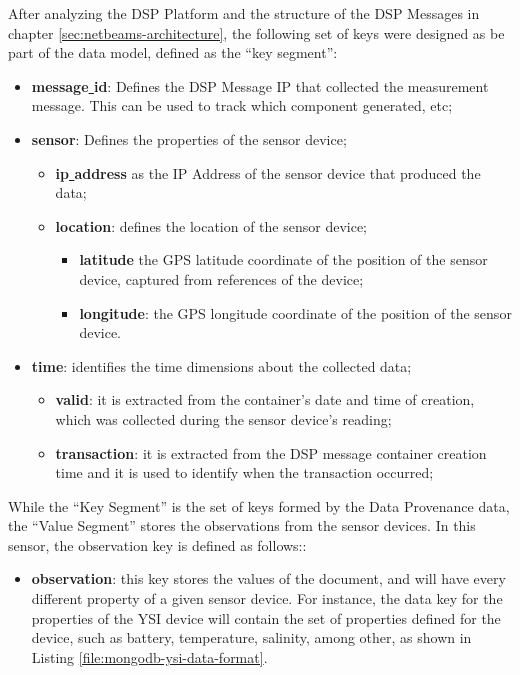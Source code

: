 After analyzing the DSP Platform and the structure of the DSP Messages in
chapter \ref{sec:netbeams-architecture}, the following set of keys were designed
as be part of the data model, defined as the ``key segment'':

\begin{itemize}
  \item \textbf{message\underline{ }id}: Defines the DSP Message IP that
  collected the measurement message. This can be used to track which component generated, etc;
  \item \textbf{sensor}: Defines the properties of the sensor device;
    \begin{itemize}[label=\textbullet]
        \item \textbf{ip\underline{ }address} as the IP Address of the sensor
        device that produced the data;
        \item \textbf{location}: defines the location of the sensor device;
            \begin{itemize}[label=\textbullet]
                \item \textbf{latitude} the GPS latitude coordinate of the
                position of the sensor device, captured from references of the device;
                \item \textbf{longitude}: the GPS longitude coordinate of the
                position of the sensor device.
            \end{itemize}
    \end{itemize}
  \item \textbf{time}: identifies the time dimensions about the collected data;
    \begin{itemize}[label=\textbullet]
      \item \textbf{valid}: it is extracted from the container's date and time
      of creation, which was collected during the sensor device's reading;
      \item \textbf{transaction}: it is extracted from the DSP message
         container creation time and it is used to identify when the
         transaction occurred;
    \end{itemize} 
\end{itemize}

While the ``Key Segment'' is the set of keys formed by the Data Provenance
data, the ``Value Segment'' stores the observations from the sensor
devices. In this sensor, the observation key is defined as follows::

\begin{itemize}
  \item \textbf{observation}: this key stores the values of the document, and
  will have every different property of a given sensor device. For instance, the
  data key for the properties of the YSI device will contain the set of properties 
  defined for the device, such as battery, temperature, salinity, among other,
  as shown in Listing \ref{file:mongodb-ysi-data-format}.
\end{itemize}

